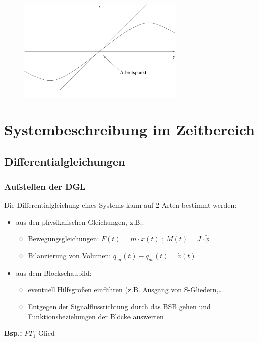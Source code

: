 \message{ !name(Mitschrieb_SysRegel.tex)}\documentclass[12pt,a4paper,ngerman]{scrartcl}
\begin{document}
\begin{figure}[H]
\center
\includegraphics[width=8cm]{sysregel_linear}
\end{figure}

\section{Systembeschreibung im Zeitbereich}

\subsection{Differentialgleichungen}

\subsubsection{Aufstellen der DGL}

Die Differentialgleichung eines Systems kann auf 2 Arten bestimmt werden:
\begin{itemize}
\item aus den physikalischen Gleichungen, z.B.:
  \begin{itemize}
  \item Bewegungsgleichungen: $F(t)=m \cdot \ddot{x}(t)$ ; $M(t)=J \cdot \ddot{\phi}$
  \item Bilanzierung von Volumen: $q_{zu}(t)-q_{ab}(t)=\dot{v}(t)$ 
  \end{itemize}
\item aus dem Blockschaubild:
  \begin{itemize}
  \item eventuell Hilfsgrößen einführen (z.B. Ausgang von S-Gliedern,\dots
  \item Entgegen der Signalflussrichtung durch das BSB gehen und Funktionsbeziehungen der Blöcke auswerten
   \end{itemize}
\end{itemize}
\textbf{Bsp.:} $PT_1$-Glied
\end{document}
